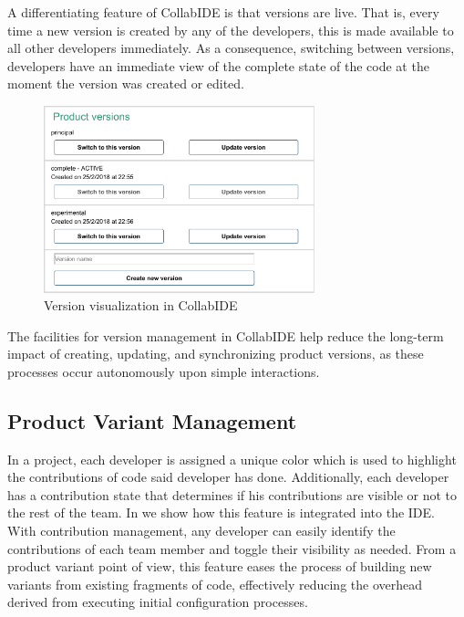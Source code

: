 A differentiating feature of CollabIDE is that versions are live. That is, every time a new version is 
created by any of the developers, this is made available to all other developers immediately. 
As a consequence, switching between versions, developers have an immediate view of the complete 
state of the code at the moment the version was created or edited. 

\begin{figure}[tbp]
  \centering
  \includegraphics[width=0.7\textwidth]{img/fig4-collabIDEVersionManagement}
  \caption{Version visualization in CollabIDE}
  \label{fig:versions}
\end{figure}

The facilities for version management in CollabIDE help reduce the long-term impact of creating, 
updating, and synchronizing product versions, as these processes occur autonomously upon simple 
interactions.

\subsection{Product Variant Management}
In a project, each developer is assigned a unique color which is used to highlight the contributions of code said developer has done. Additionally, each developer has a contribution state that determines if his contributions are visible or not to the rest of the team. In  we show how this feature is integrated into the IDE. With contribution management, any developer can easily identify the contributions of each team member and toggle their visibility as needed. From a product variant point of view, this feature eases the process of building new variants from existing fragments of code, effectively reducing the overhead derived from executing initial configuration processes.

